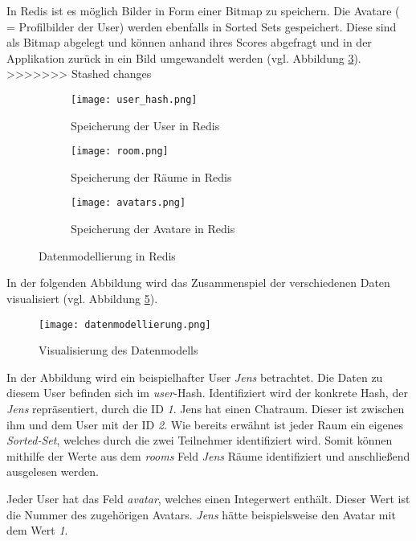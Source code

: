 In \acs{Redis} ist es möglich Bilder in Form einer Bitmap zu speichern. Die Avatare ( = Profilbilder der User) werden ebenfalls in Sorted Sets gespeichert. Diese sind als Bitmap abgelegt und können anhand ihres Scores abgefragt und in der Applikation zurück in ein Bild umgewandelt werden (vgl. Abbildung \ref{fig:sub3}).
>>>>>>> Stashed changes
\begin{figure}[h]
	\centering
	
	\begin{subfigure}{0.3\textwidth}
		\centering
		\texttt{[image: user\_hash.png]}
		\caption{Speicherung der User in \acs{Redis}}
		\label{fig:sub1}
	\end{subfigure}%
	\hspace{0.02\textwidth}
	\begin{subfigure}{0.3\textwidth}
		\centering
		\texttt{[image: room.png]}
		\caption{Speicherung der Räume in \acs{Redis}}
		\label{fig:sub2}
	\end{subfigure}%
	\hspace{0.02\textwidth}
	\begin{subfigure}{0.3\textwidth}
		\centering
		\texttt{[image: avatars.png]}
		\caption{Speicherung der Avatare in \acs{Redis}}
		\label{fig:sub3}
	\end{subfigure}
	
	\caption{Datenmodellierung in \acs{Redis}}
	\label{fig:overall}
\end{figure}

In der folgenden Abbildung wird das Zusammenspiel der verschiedenen Daten visualisiert (vgl. Abbildung \ref{fig:datenmodell}). 
\begin{figure}[h]
	\centering
	\texttt{[image: datenmodellierung.png]}
	\caption{Visualisierung des Datenmodells}
	\label{fig:datenmodell}
\end{figure}

In der Abbildung wird ein beispielhafter User \textit{Jens} betrachtet. Die Daten zu diesem User befinden sich im \textit{user}-Hash. Identifiziert wird der konkrete Hash, der \textit{Jens} repräsentiert, durch die ID \textit{1}. Jens hat einen Chatraum. Dieser ist zwischen ihm und dem User mit der ID \textit{2}. Wie bereits erwähnt ist jeder Raum ein eigenes \textit{Sorted-Set}, welches durch die zwei Teilnehmer identifiziert wird. Somit können mithilfe der Werte aus dem \textit{rooms} Feld \textit{Jens} Räume identifiziert und anschließend ausgelesen werden.

Jeder User hat das Feld \textit{avatar}, welches einen Integerwert enthält. Dieser Wert ist die Nummer des zugehörigen Avatars. \textit{Jens} hätte beispielsweise den Avatar mit dem Wert \textit{1}.
